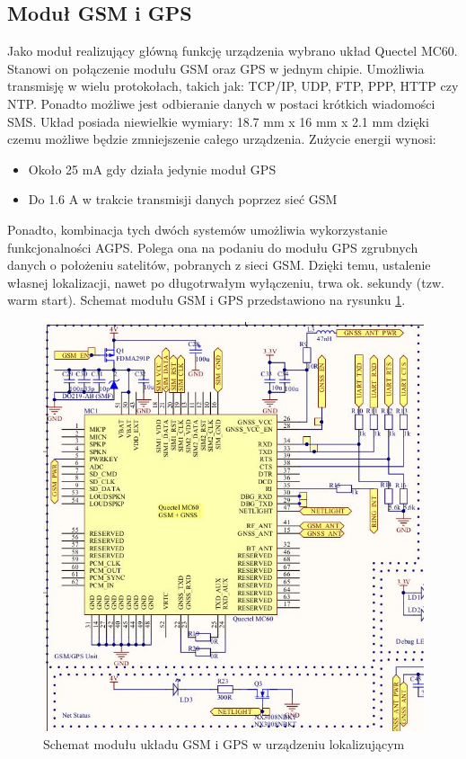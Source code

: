 \subsection{Moduł GSM i GPS}

Jako moduł realizujący główną funkcję urządzenia wybrano układ Quectel MC60. Stanowi on połączenie modułu GSM oraz GPS w jednym chipie. Umożliwia transmisję w wielu protokołach, takich jak: TCP/IP, UDP, FTP, PPP, HTTP czy NTP. Ponadto możliwe jest odbieranie danych w postaci krótkich wiadomości SMS. Układ posiada niewielkie wymiary: 18.7 mm x 16 mm x 2.1 mm dzięki czemu możliwe będzie zmniejszenie całego urządzenia. Zużycie energii wynosi:
\begin{itemize}
\item Około 25 mA gdy działa jedynie moduł GPS
\item Do 1.6 A w trakcie transmisji danych poprzez sieć GSM
\end{itemize}

Ponadto, kombinacja tych dwóch systemów umożliwia wykorzystanie funkcjonalności AGPS. Polega ona na podaniu do modułu GPS zgrubnych danych o położeniu satelitów, pobranych z sieci GSM. Dzięki temu, ustalenie własnej lokalizacji, nawet po długotrwałym wyłączeniu, trwa ok. sekundy (tzw. warm start). Schemat modułu GSM i GPS przedstawiono na rysunku \ref{fig:image_mainboard_functional_gps_gsm}.

\begin{figure}[H]
	\centering
	\includegraphics[width=15cm]{img/schematics/mainboard_functional_gps.jpg}
	\caption{Schemat modułu układu GSM i GPS w urządzeniu lokalizującym}
	\label{fig:image_mainboard_functional_gps_gsm}
\end{figure}

